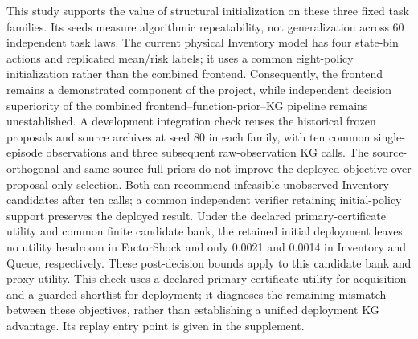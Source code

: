 This study supports the value of structural initialization on these three
fixed task families.  Its seeds measure algorithmic repeatability, not
generalization across 60 independent task laws.  The current physical
Inventory model has four state-bin actions and replicated mean/risk labels;
it uses a common eight-policy initialization rather than the combined frontend.
Consequently, the frontend remains a demonstrated component of the project,
while independent decision superiority of the combined frontend--function-prior--KG
pipeline remains unestablished.  A development integration check reuses the
historical frozen proposals and source archives at seed 80 in each family,
with ten common single-episode observations and three subsequent raw-observation
KG calls.  The source-orthogonal and same-source full priors do not improve
the deployed objective over proposal-only selection.  Both can recommend
infeasible unobserved Inventory candidates after ten calls; a common independent
verifier retaining initial-policy support preserves the deployed result.
Under the declared primary-certificate utility and common finite candidate
bank, the retained initial deployment leaves no utility headroom in FactorShock
and only 0.0021 and 0.0014 in Inventory and Queue, respectively.  These
post-decision bounds apply to this candidate bank and proxy utility.
This check uses a declared primary-certificate utility for acquisition and a
guarded shortlist for deployment; it diagnoses the remaining mismatch between
these objectives, rather than establishing a unified deployment KG advantage.
Its replay entry point is given in the supplement.
